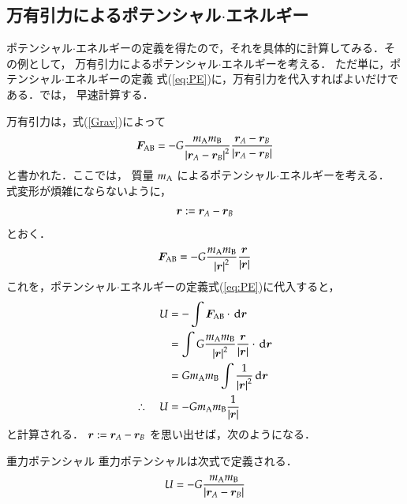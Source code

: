         \subsection{万有引力によるポテンシャル$\cdot$エネルギー}
            ポテンシャル$\cdot$エネルギーの定義を得たので，それを具体的に計算してみる．その例として，
            万有引力によるポテンシャル$\cdot$エネルギーを考える．
            ただ単に，ポテンシャル$\cdot$エネルギーの定義
            式(\ref{eq:PE})に，万有引力を代入すればよいだけである．では，
            早速計算する．

            万有引力は，式(\ref{Grav})によって
                \begin{align}
                    \boldsymbol{F}_{\rm{AB}}
                    = -G\frac{m_{\rm{A}}m_{\rm{B}}}{{\left| \boldsymbol{r}_{A}
                    -\boldsymbol{r}_{B} \right|}^{2}}
                    \frac{\boldsymbol{r}_{A}-\boldsymbol{r}_{B}}{\left| \boldsymbol{r}_{A}
                    -\boldsymbol{r}_{B} \right|}
                \end{align}
            と書かれた．ここでは， 質量 $m_{\rm{A}}$ によるポテンシャル$\cdot$エネルギーを考える．
            式変形が煩雑にならないように，
                \begin{align*}
                \boldsymbol{r}:=\boldsymbol{r}_{A}-\boldsymbol{r}_{B}
                \end{align*}
            とおく．
                \begin{align}
                    \boldsymbol{F}_{\rm{AB}}
                    = -G\frac{m_{\rm{A}}m_{\rm{B}}}{{\left| \boldsymbol{r} \right|}^{2}}
                    \frac{\boldsymbol{r}}{\left| \boldsymbol{r} \right|}
                \end{align}
            これを，ポテンシャル$\cdot$エネルギーの定義式(\ref{eq:PE})に代入すると，
                \begin{align}
                    U&=-\int \boldsymbol{F}_{\rm{AB}}\cdot \,\mathrm{d}\boldsymbol{r}  \notag \\
                     &=\int G\frac{m_{\rm{A}}m_{\rm{B}}}{{\left| \boldsymbol{r} \right|}^{2}}
                    \frac{\boldsymbol{r}}{\left| \boldsymbol{r} \right|} \cdot \,\mathrm{d}\boldsymbol{r} \notag \\
                     &=Gm_{\rm{A}}m_{\rm{B}}\int \frac{1}{\left| \boldsymbol{r} \right|^{2}}\,\mathrm{d}\boldsymbol{r} \notag \\
                     \therefore \quad U
                     &=-Gm_{\rm{A}}m_{\rm{B}}\frac{1}{\left| \boldsymbol{r} \right|}
                \end{align}
            と計算される．
            $\boldsymbol{r}:=\boldsymbol{r}_{A}-\boldsymbol{r}_{B}$ を思い出せば，次のようになる．
                \begin{myshadebox}{重力ポテンシャル}
                    重力ポテンシャルは次式で定義される．
                    \begin{align}\label{eq:Grav_1}
                        U=-G\frac{m_{\rm{A}}m_{\rm{B}}}{\left| \br_{A}-\br_{B}\right|}
                    \end{align}
                \end{myshadebox}

